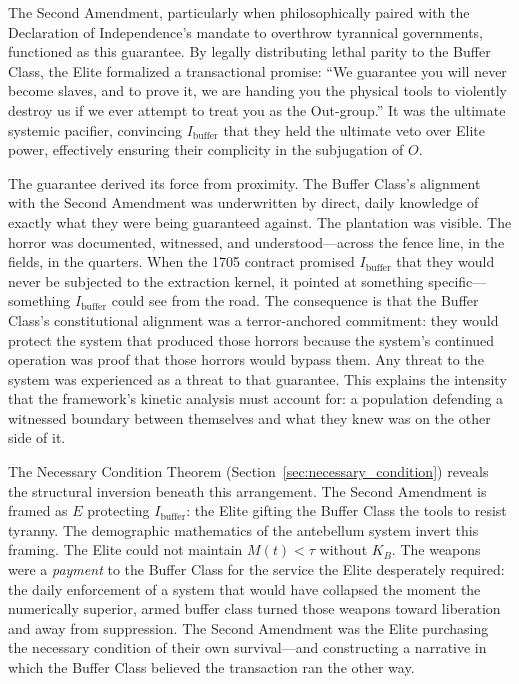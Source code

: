 The Second Amendment, particularly when philosophically paired with the Declaration of Independence's mandate to overthrow tyrannical governments, functioned as this guarantee. By legally distributing lethal parity to the Buffer Class, the Elite formalized a transactional promise: ``We guarantee you will never become slaves, and to prove it, we are handing you the physical tools to violently destroy us if we ever attempt to treat you as the Out-group.'' It was the ultimate systemic pacifier, convincing $I_{\text{buffer}}$ that they held the ultimate veto over Elite power, effectively ensuring their complicity in the subjugation of $O$.

The guarantee derived its force from proximity. The Buffer Class's alignment with the Second Amendment was underwritten by direct, daily knowledge of exactly what they were being guaranteed against. The plantation was visible. The horror was documented, witnessed, and understood---across the fence line, in the fields, in the quarters. When the 1705 contract promised $I_{\text{buffer}}$ that they would never be subjected to the extraction kernel, it pointed at something specific---something $I_{\text{buffer}}$ could see from the road. The consequence is that the Buffer Class's constitutional alignment was a terror-anchored commitment: they would protect the system that produced those horrors because the system's continued operation was proof that those horrors would bypass them. Any threat to the system was experienced as a threat to that guarantee. This explains the intensity that the framework's kinetic analysis must account for: a population defending a witnessed boundary between themselves and what they knew was on the other side of it.

The Necessary Condition Theorem (Section~\ref{sec:necessary_condition}) reveals the structural inversion beneath this arrangement. The Second Amendment is framed as $E$ protecting $I_{\text{buffer}}$: the Elite gifting the Buffer Class the tools to resist tyranny. The demographic mathematics of the antebellum system invert this framing. The Elite could not maintain $M(t) < \tau$ without $K_B$. The weapons were a \textit{payment} to the Buffer Class for the service the Elite desperately required: the daily enforcement of a system that would have collapsed the moment the numerically superior, armed buffer class turned those weapons toward liberation and away from suppression. The Second Amendment was the Elite purchasing the necessary condition of their own survival---and constructing a narrative in which the Buffer Class believed the transaction ran the other way.

